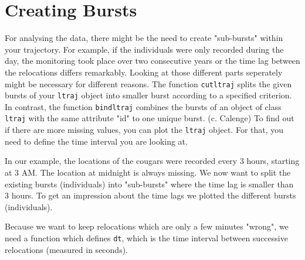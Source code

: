 \documentclass[11pt, a4paper]{article} %
\begin{document}
\section{Creating Bursts}%

For analysing the data, there might be the need to create "sub-bursts" within your trajectory. For example, if the individuals were only recorded during the day, the monitoring took place over two consecutive years or the time lag between the relocations differs remarkably. Looking at those different parts seperately might be necessary for different reasons. The function \texttt{cutltraj} splits the given bursts of your \texttt{ltraj} object into smaller burst according to a specified criterion. In contrast, the function \texttt{bindltraj} combines the bursts of an object of class \texttt{ltraj} with the same attribute "id" to one unique burst. (c. Calenge) To find out if there are more missing values, you can plot the \texttt{ltraj} object. For that, you need to define the time interval you are looking at. 


In our example, the locations of the cougars were recorded every 3 hours, starting at 3 AM. The location at midnight is always missing. We now want to split the existing bursts (individuals) into "sub-bursts" where the time lag is smaller than 3 hours. To get an impression about the time lags we plotted the different bursts (individuals).

\begin{knitrout}
\color{fgcolor}\begin{kframe}
\begin{alltt}
 \hlstd{)}
 \hlstd{)}
\end{alltt}
\end{kframe}
\end{knitrout}

Because we want to keep relocations which are only a few minutes "wrong", we need a function which defines \texttt{dt}, which is the time interval between successive relocations (measured in seconds).

\begin{knitrout}
\color{fgcolor}\begin{kframe}
\begin{alltt}
 \hlkwb{=} \hlstd{(}\hlstd{) \{}\hlopt{>} \hlstd{(}\hlopt{*}\hlstd{))\}}
\end{alltt}
\end{kframe}
\end{knitrout}
\end{document}

